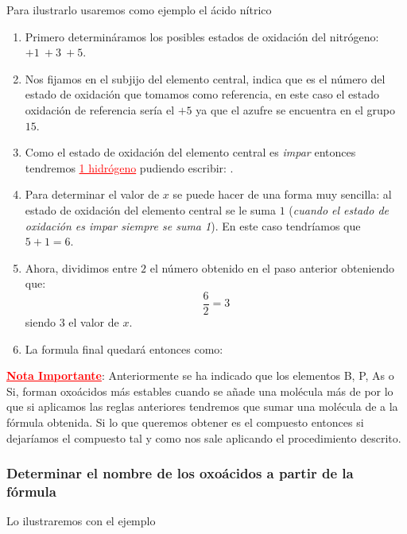 \documentclass[12pt]{article}
\begin{document}
Para ilustrarlo usaremos como ejemplo el ácido nítrico

\begin{enumerate}[label=\numberballgreen]
    \item Primero determináramos los posibles estados de oxidación del nitrógeno: $+1\ +3\ +5$.
    \item Nos fijamos en el subjijo del elemento central,  indica que es el número del estado de oxidación que tomamos como referencia, en este caso el estado oxidación de referencia sería el $+5$ ya que el azufre se encuentra en el grupo $15$.
    \item Como el estado de oxidación del elemento central es \textit{impar} entonces tendremos \textcolor{red}{\uline{1 hidrógeno}} pudiendo escribir: .
    \item Para determinar el valor de $x$ se puede hacer de una forma muy sencilla: al estado de oxidación del elemento central se le suma $1$ (\textit{cuando el estado de oxidación es impar siempre se suma 1}). En este caso tendríamos que $5 + 1 = 6$.
    \item Ahora, dividimos entre $2$ el número obtenido en el paso anterior obteniendo que:
          \[\frac{6}{2} = 3\]
          siendo $3$ el valor de $x$.
    \item La formula final quedará entonces como: 
\end{enumerate}

\textbf{\textcolor{red}{\uline{Nota Importante}}}: Anteriormente se ha indicado que los elementos B, P, As o Si, forman oxoácidos más estables cuando se añade una molécula más de  por lo que si aplicamos las reglas anteriores tendremos que sumar una molécula de  a la fórmula obtenida. Si lo que queremos obtener es el compuesto  entonces si dejaríamos el compuesto tal y como nos sale aplicando el procedimiento descrito.


\subsubsection{Determinar el nombre de los oxoácidos a partir de la fórmula}

Lo ilustraremos con el ejemplo 
\end{document}
